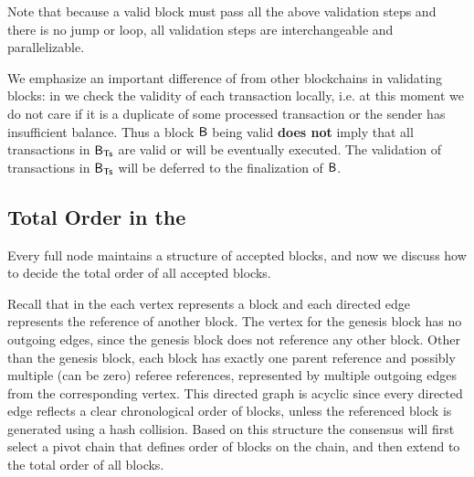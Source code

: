 Note that because a valid block must pass all the above validation steps and there is no jump or loop, 
all validation steps are interchangeable and parallelizable. 


We emphasize an important difference of {\name} from other blockchains in validating blocks: 
in {\name} we check the validity of each transaction locally,
i.e. at this moment we do not care if it is a duplicate of some processed transaction or the sender has insufficient balance.
Thus a block $\textsf{B}$ being valid \textbf{does not} imply that all transactions in $\textsf{B}_{\textsf{Ts}}$ are valid or will be eventually executed.
The validation of transactions in $\textsf{B}_{\textsf{Ts}}$ will be deferred to the finalization of $\textsf{B}$.



\subsection{Total Order in the \tg}


Every {\name} full node maintains a \tg structure of accepted blocks, and now we discuss how to decide the total order of all accepted blocks.

Recall that in the \tg each vertex represents a {\name} block and each directed edge represents the reference of another block.
The vertex for the genesis block has no outgoing edges, since the genesis block does not reference any other block.
Other than the genesis block, each block has exactly one parent reference and possibly multiple (can be zero) referee references, represented by multiple outgoing edges from the corresponding vertex.
This directed graph is acyclic since every directed edge reflects a clear chronological order of blocks, unless the referenced block is generated using a hash collision. 
Based on this \tg structure the {\name} consensus will first select a pivot chain that defines order of blocks on the chain, and then extend to the total order of all blocks. 


